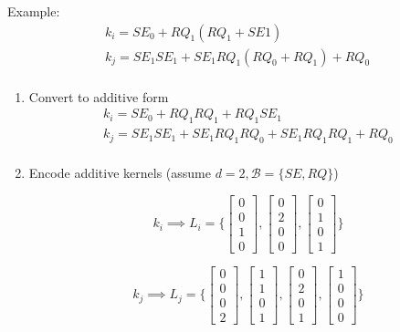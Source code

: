 \documentclass{article}
\begin{document}
Example:
\begin{gather*}
    k_i = SE_0 + RQ_1(RQ_1 + SE1)\\
    k_j = SE_1 SE_1 + SE_1 RQ_1(RQ_0 + RQ_1)+RQ_0\\
\end{gather*}
\begin{enumerate}
\item Convert to additive form
\begin{gather*}
    k_i = SE_0 + RQ_1 RQ_1 + RQ_1 SE_1\\
    k_j = SE_1 SE_1 + SE_1 RQ_1 RQ_0 + SE_1 RQ_1 RQ_1 + RQ_0\\
\end{gather*}

\item Encode additive kernels (assume $d=2, \mathcal{B} = \{SE, RQ\}$)

\[k_i \implies  L_i = \{
\begin{bmatrix} 0 \\0 \\ 1 \\ 0 \end{bmatrix}, 
\begin{bmatrix} 0 \\ 2 \\ 0 \\ 0 \end{bmatrix},
\begin{bmatrix} 0 \\ 1 \\ 0 \\ 1 \end{bmatrix}
\}\]
 
\[k_j \implies  L_j = \{
\begin{bmatrix} 0 \\ 0 \\ 0 \\ 2 \end{bmatrix}, 
\begin{bmatrix} 1 \\ 1 \\ 0 \\ 1 \end{bmatrix},
\begin{bmatrix} 0 \\ 2 \\ 0 \\ 1 \end{bmatrix},
\begin{bmatrix} 1 \\ 0 \\ 0 \\ 0 \end{bmatrix}
\}\]


\end{enumerate}
\end{document}
